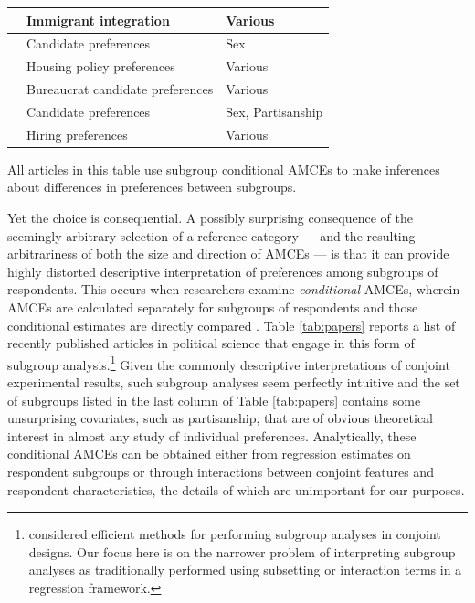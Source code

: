 \documentclass[a4paper,12pt]{article}\usepackage[]{graphicx}\usepackage[]{color}
\begin{document}
\begin{table}
\begin{center}
\begin{tabular}{p{2in} p{2in} p{2in}}
\citet{Sobolewskaetal2017} & Immigrant integration & Various \\ \midrule
\citet{EggersVivyanWagner2018} & Candidate preferences & Sex \\ \midrule
\citet{Hankinson2018} & Housing policy preferences & Various \\ \midrule
\citet{OliverosSchuster2018} & Bureaucrat candidate preferences & Various \\ \midrule
\citet{TeeleKallaRosenbluth2018} & Candidate preferences & Sex, Partisanship \\ \midrule
\citet{Careyetal2018} & Hiring preferences & Various \\ \midrule
\bottomrule
\end{tabular}
\end{center}
All articles in this table use subgroup conditional AMCEs to make inferences about differences in preferences between subgroups.
\end{table}

Yet the choice is consequential. A possibly surprising consequence of the seemingly arbitrary selection of a reference category --- and the resulting arbitrariness of both the size and direction of AMCEs --- is that it can provide highly distorted descriptive interpretation of preferences among subgroups of respondents. This occurs when researchers examine \textit{conditional} AMCEs, wherein AMCEs are calculated separately for subgroups of respondents and those conditional estimates are directly compared \citep[13]{HainmuellerHopkinsYamamoto2014}. Table \ref{tab:papers} reports a list of recently published articles in political science that engage in this form of subgroup analysis.\footnote{\citet{RatkovicTingley2017} considered efficient methods for performing subgroup analyses in conjoint designs. Our focus here is on the narrower problem of interpreting subgroup analyses as traditionally performed using subsetting or interaction terms in a regression framework.} Given the commonly descriptive interpretations of conjoint experimental results, such subgroup analyses seem perfectly intuitive and the set of subgroups listed in the last column of Table \ref{tab:papers} contains some unsurprising covariates, such as partisanship, that are of obvious theoretical interest in almost any study of individual preferences. Analytically, these conditional AMCEs can be obtained either from regression estimates on respondent subgroups or through interactions between conjoint features and respondent characteristics, the details of which are unimportant for our purposes.
\end{document}
